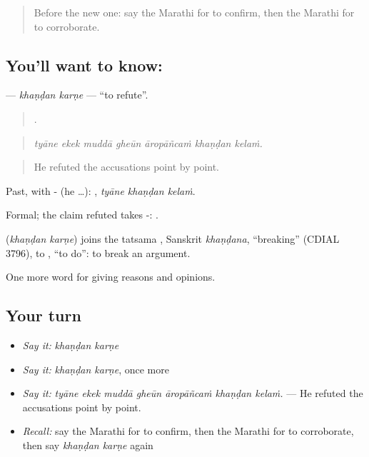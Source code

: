 \label{lesson:MR-C353-khandan-karne}



\begin{quote}
Before the new one: say the Marathi for to confirm, then the Marathi for to corroborate.
\end{quote}

\subsection*{You'll want to know:  }
\textbf{ } — \emph{khaṇḍan karṇe} — \textquotedblleft{}to refute\textquotedblright{}.

\begin{quote}
      .
\end{quote}

\begin{quote}
\emph{tyāne ekek muddā gheūn āropāñcaṁ khaṇḍan kelaṁ.}
\end{quote}

\begin{quote}
He refuted the accusations point by point.
\end{quote}

Past, with - (he …):   , \emph{tyāne khaṇḍan kelaṁ}.

Formal; the claim refuted takes -:  .

\begin{cousinweb}
\textbf{ } (\emph{khaṇḍan karṇe}) joins the tatsama , Sanskrit \emph{khaṇḍana}, \textquotedblleft{}breaking\textquotedblright{} (CDIAL 3796), to , \textquotedblleft{}to do\textquotedblright{}: to break an argument.
\end{cousinweb}

\begin{grammarlens}[title={What you've built}]
One more word for giving reasons and opinions.
\end{grammarlens}

\subsection*{Your turn}
\begin{itemize}
\raggedright
  \item \emph{Say it:} \emph{khaṇḍan karṇe}
  \item \emph{Say it:} \emph{khaṇḍan karṇe}, once more
  \item \emph{Say it:} \emph{tyāne ekek muddā gheūn āropāñcaṁ khaṇḍan kelaṁ.} — He refuted the accusations point by point.
  \item \emph{Recall:} say the Marathi for to confirm, then the Marathi for to corroborate, then say \emph{khaṇḍan karṇe} again
\end{itemize}

